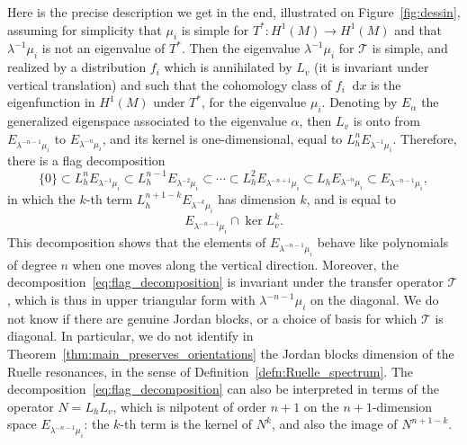 \documentclass[10pt]{amsart}
\newcommand{\boT}{\mathcal{T}}
\newcommand{\dd}{\mathop{}\!\mathrm{d}}
\theoremstyle{definition}
\numberwithin{equation}{section}
\begin{document}
Here is the precise description we get in the end, illustrated on
Figure~\ref{fig:dessin}, assuming for simplicity that $\mu_i$ is simple for
$T^* : H^1(M) \to H^1(M)$ and that $\lambda^{-1}\mu_i$ is not an eigenvalue
of $T^*$. Then the eigenvalue $\lambda^{-1} \mu_i$ for $\boT$ is simple, and
realized by a distribution $f_i$ which is annihilated by $L_v$ (\ie it is
invariant under vertical translation) and such that the cohomology class of
$f_i \dd x$ is the eigenfunction in $H^1(M)$ under $T^*$, for the eigenvalue
$\mu_i$. Denoting by $E_\alpha$ the generalized eigenspace associated to the
eigenvalue $\alpha$, then $L_v$ is onto from $E_{\lambda^{-n-1} \mu_i}$ to
$E_{\lambda^{-n} \mu_i}$, and its kernel is one-dimensional, equal to $L_h^n
E_{\lambda^{-1}\mu_i}$. Therefore, there is a flag decomposition
\begin{equation}
\label{eq:flag_decomposition}
\{0\} \subset L_h^n E_{\lambda^{-1}\mu_i} \subset L_h^{n-1} E_{\lambda^{-2}\mu_i}
\subset \dotsb \subset L_h^2 E_{\lambda^{-n+1} \mu_i} \subset L_h E_{\lambda^{-n} \mu_i}
\subset E_{\lambda^{-n-1}\mu_i},
\end{equation}
in which the $k$-th term $L_h^{n+1-k} E_{\lambda^{-k} \mu_i}$ has dimension
$k$, and is equal to
\[
E_{\lambda^{-n-1}\mu_i} \cap \ker L_v^k.
\]
This
decomposition shows that the elements of $E_{\lambda^{-n-1}\mu_i}$ behave
like polynomials of degree $n$ when one moves along the vertical direction.
Moreover, the decomposition~\eqref{eq:flag_decomposition} is invariant under
the transfer operator $\boT$, which is thus in upper triangular form with
$\lambda^{-n-1}\mu_i$ on the diagonal. We do not know if there are genuine
Jordan blocks, or a choice of basis for which $\boT$ is diagonal. In
particular, we do not identify in
Theorem~\ref{thm:main_preserves_orientations} the Jordan blocks dimension of
the Ruelle resonances, in the sense of Definition~\ref{defn:Ruelle_spectrum}.
The decomposition~\eqref{eq:flag_decomposition} can also be interpreted in
terms of the operator $N = L_h L_v$, which is nilpotent of order $n+1$ on the
$n+1$-dimension space $E_{\lambda^{-n-1} \mu_i}$: the $k$-th term is the
kernel of $N^k$, and also the image of $N^{n+1-k}$.
%
\end{document}
